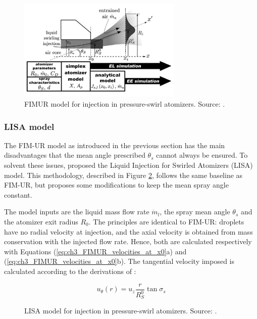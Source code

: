 \begin{figure}[ht]
    \centering
    \includegraphics[width=0.7\textwidth]{./part1_numerical_approaches/figures_ch3/FIMUR}
       \centering
    \caption{FIMUR model for injection in pressure-swirl atomizers. Source: .}
    \label{fig:FIMUR_methodology}
\end{figure}

\newpage

\subsubsection*{LISA model}

The FIM-UR model as introduced in the previous section has the main disadvantages that the mean angle prescribed $\theta_s$ cannot always be ensured. To solvent these issues,  proposed the Liquid Injection for Swirled Atomizers (LISA) model. This methodology, described in Figure \ref{fig:LISA_methodology}, follows the same baseline as FIM-UR, but proposes some modifications to keep the mean spray angle constant.

The model inputs are the liquid mass flow rate $\dot{m}_l$, the spray mean angle $\theta_s$ and the atomizer exit radius $R_0$. The principles are identical to FIM-UR: droplets have no radial velocity at injection, and the axial velocity is obtained from mass conservation with the injected flow rate. Hence, both are calculated respectively with Equations (\ref{eq:ch3_FIMUR_velocities_at_x0}a) and (\ref{eq:ch3_FIMUR_velocities_at_x0}b). The tangential velocity imposed is calculated according to the derivations of :

\begin{equation}
u_\theta \left( r \right) = u_z  \frac{r}{R_S^0} \tan \sigma_s
\end{equation}


\begin{figure}[ht]
    \centering
       \centering
    \caption{LISA model for injection in pressure-swirl atomizers. Source: .}
    \label{fig:LISA_methodology}
\end{figure}



